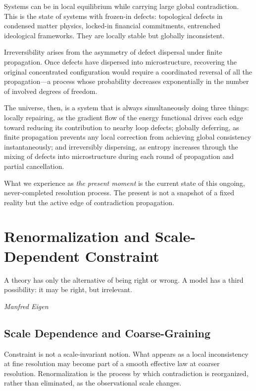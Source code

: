 \documentclass[12pt,a4paper,openany]{book}
\theoremstyle{plain}
\theoremstyle{definition}
\theoremstyle{remark}
\begin{document}
Systems can be in local equilibrium while carrying large global contradiction. This is the state of systems with frozen-in defects: topological defects in condensed matter physics, locked-in financial commitments, entrenched ideological frameworks. They are locally stable but globally inconsistent.

Irreversibility arises from the asymmetry of defect dispersal under finite propagation. Once defects have dispersed into microstructure, recovering the original concentrated configuration would require a coordinated reversal of all the propagation---a process whose probability decreases exponentially in the number of involved degrees of freedom.

The universe, then, is a system that is always simultaneously doing three things: locally repairing, as the gradient flow of the energy functional drives each edge toward reducing its contribution to nearby loop defects; globally deferring, as finite propagation prevents any local correction from achieving global consistency instantaneously; and irreversibly dispersing, as entropy increases through the mixing of defects into microstructure during each round of propagation and partial cancellation.

What we experience as \emph{the present moment} is the current state of this ongoing, never-completed resolution process. The present is not a snapshot of a fixed reality but the active edge of contradiction propagation.



\chapter{Renormalization and Scale-Dependent Constraint}
\label{chap:renormalization}

\epigraph{%
  A theory has only the alternative of being right or wrong.
  A model has a third possibility: it may be right, but irrelevant.
}{%
  \textit{Manfred Eigen}}

\section{Scale Dependence and Coarse-Graining}

Constraint is not a scale-invariant notion. What appears as a local inconsistency at fine resolution may become part of a smooth effective law at coarser resolution. Renormalization is the process by which contradiction is reorganized, rather than eliminated, as the observational scale changes.
\end{document}
